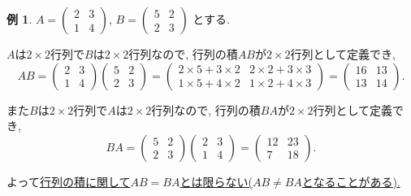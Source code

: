 \documentclass[dvipdfmx,a4paper,11pt]{article} %
\theoremstyle{definition}
\newtheorem{exa}[thm]{例}
\begin{document}
 \begin{exa}
 $ A= 
 \begin{pmatrix}
2 & 3\\
1 & 4
 \end{pmatrix}
 $, $
 B = 
 \begin{pmatrix}
5 & 2\\
2 & 3
 \end{pmatrix}
 $
 とする. 
 
 $A$は$2\times 2$行列で$B$は$2 \times 2$行列なので, 行列の積$AB$が$2 \times 2$行列として定義でき, 
 $$
 AB = 
 \begin{pmatrix}
2 & 3\\
1 & 4
 \end{pmatrix}
 \begin{pmatrix}
5 & 2\\
2 & 3
 \end{pmatrix}
 =  
 \begin{pmatrix}
2 \times 5 + 3 \times 2& 2 \times 2 + 3 \times 3\\
1 \times 5 + 4 \times 2 & 1\times 2 + 4 \times 3
 \end{pmatrix}
 = 
 \begin{pmatrix}
16 & 13\\
13 & 14
 \end{pmatrix}.
 $$
 
また$B$は$2\times 2$行列で$A$は$2 \times 2$行列なので, 行列の積$BA$が$2 \times 2$行列として定義でき, 
 $$
 BA = 
  \begin{pmatrix}
5 & 2\\
2 & 3
 \end{pmatrix}
  \begin{pmatrix}
2 & 3\\
1 & 4
 \end{pmatrix}
 =
  \begin{pmatrix}
12 & 23\\
7 & 18
 \end{pmatrix}.
 $$

よって\underline{行列の積に関して$AB=BA$とは限らない($AB \neq BA$となることがある).}
 \end{exa}
 
\end{document}
